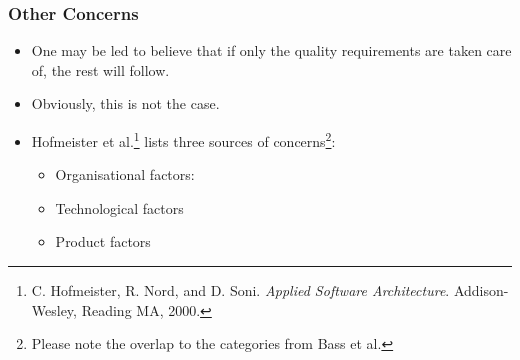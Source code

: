 \documentclass[10pt]{beamer}
\begin{document}
\begin{frame}[t]
\frametitle{Other Concerns}
\begin{itemize}
\item One may be led to believe that if only the quality requirements are taken care of, the rest will follow.
\item Obviously, this is not the case.
\item Hofmeister et al.\footnote{C. Hofmeister, R. Nord, and D. Soni. \emph{Applied Software Architecture}. Addison-Wesley, Reading MA, 2000.} lists three sources of concerns\footnote{Please note the overlap to the categories from Bass et al.}:
\begin{itemize}
\item Organisational factors:
\item Technological factors
\item Product factors
\end{itemize}
\end{itemize}
\end{frame}
\end{document}
